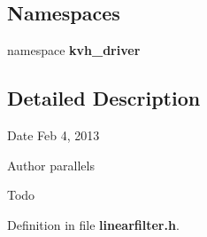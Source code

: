 \subsection*{\-Namespaces}
\begin{DoxyCompactItemize}
\item 
namespace {\bf kvh\-\_\-driver}
\end{DoxyCompactItemize}


\subsection{\-Detailed \-Description}
\begin{DoxyDate}{\-Date}
\-Feb 4, 2013 
\end{DoxyDate}
\begin{DoxyAuthor}{\-Author}
parallels 
\end{DoxyAuthor}
\begin{DoxyRefDesc}{\-Todo}
\item[{\bf \-Todo}]\end{DoxyRefDesc}


\-Definition in file {\bf linearfilter.\-h}.

